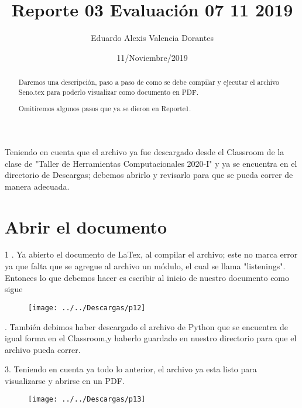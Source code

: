 \documentclass[letter,12pt]{article}
\title{Reporte 03 Evaluación 07 11 2019}
\author{Eduardo Alexis Valencia Dorantes}
\date{11/Noviembre/2019}
\begin{document}
	

\begin{abstract}
Daremos una descripción, paso a paso de como se debe compilar y ejecutar el archivo Seno.tex para poderlo visualizar como documento en PDF.

Omitiremos algunos pasos que ya se dieron en Reporte1.
\end{abstract}

Teniendo en cuenta que el archivo ya fue descargado desde el Classroom de la clase de "Taller de Herramientas Computacionales 2020-I" y ya se encuentra en el directorio de Descargas; debemos abrirlo y revisarlo para que se pueda correr de manera adecuada.

\section*{Abrir el documento}

1 . Ya abierto el documento de LaTex, al compilar el archivo; este no marca error ya que falta que se agregue al archivo un módulo, el cual se llama "listenings".
Entonces lo que debemos hacer es escribir al inicio de nuestro documento como sigue

\begin{figure}[h]
	\centering
	\texttt{[image: ../../Descargas/p12]}
	\caption{}
	\label{fig:p12}
\end{figure}

. También debimos haber descargado el archivo de Python que se encuentra de igual forma en el Classroom,y  haberlo guardado en nuestro directorio para que el archivo pueda correr.

3. Teniendo en cuenta ya todo lo anterior, el archivo ya esta listo para visualizarse y abrirse en un PDF.

\begin{figure}[h]
	\centering
	\texttt{[image: ../../Descargas/p13]}
	\caption{}
	\label{fig:p13}
\end{figure}
\end{document}
